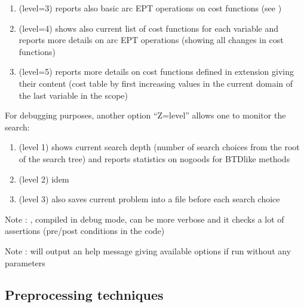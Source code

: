 \documentclass[letterpaper,10pt,openany,oneside,english]{sphinxmanual}
\begin{document}
\begin{fulllineitems}
\begin{enumerate}
\item {} 
\sphinxAtStartPar
(level=3) reports also basic arc EPT operations on cost functions (see {\hyperref[\detokenize{ref/ref_modules:group__softac}]{}})

\item {} 
\sphinxAtStartPar
(level=4) shows also current list of cost functions for each variable and reports more details on arc EPT operations (showing all changes in cost functions)

\item {} 
\sphinxAtStartPar
(level=5) reports more details on cost functions defined in extension giving their content (cost table by first increasing values in the current domain of the last variable in the scope)

\end{enumerate}


\sphinxAtStartPar
For debugging purposes, another option “\sphinxhyphen{}Z=level” allows one to monitor the search:\begin{enumerate}
%
\item {} 
\sphinxAtStartPar
(level 1) shows current search depth (number of search choices from the root of the search tree) and reports statistics on nogoods for BTD\sphinxhyphen{}like methods

\item {} 
\sphinxAtStartPar
(level 2) idem

\item {} 
\sphinxAtStartPar
(level 3) also saves current problem into a file before each search choice

\end{enumerate}


\sphinxAtStartPar
Note : , compiled in debug mode, can be more verbose and it checks a lot of assertions (pre/post conditions in the code)

\sphinxAtStartPar
Note :  will output an help message giving available options if run without any parameters 

\end{fulllineitems}



\subsection{Preprocessing techniques}
\label{\detokenize{ref/ref_modules:preprocessing-techniques}}
\end{document}
